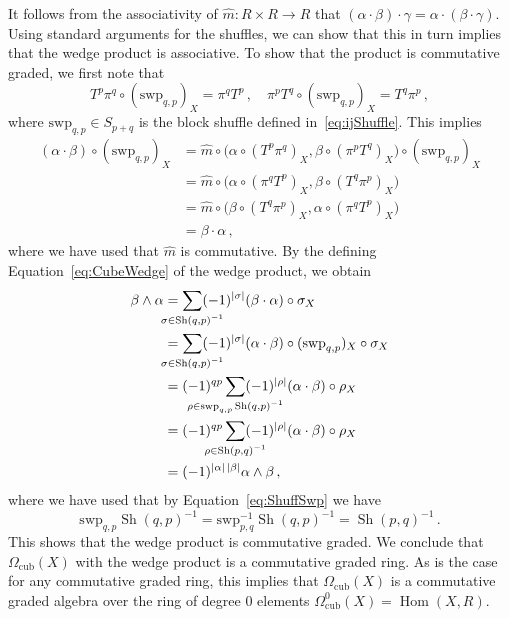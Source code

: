 \documentclass[12pt,reqno, a4paper]{amsart}
\numberwithin{equation}{section}
\theoremstyle{plain}
\theoremstyle{definition}
\theoremstyle{remark}
\DeclareMathOperator{\Hom}{Hom}
\DeclareMathOperator{\Shuff}{Sh}
\newcommand{\Rmult}{\hat{m}}
\newcommand{\Swp}{\mathrm{swp}}
\begin{document}
It follows from the associativity of $\Rmult: R \times R \to R$ that $(\alpha \cdot \beta) \cdot \gamma = \alpha \cdot (\beta \cdot \gamma)$. Using standard arguments for the shuffles, we can show that this in turn implies that the wedge product is associative. To show that the product is commutative graded, we first note that
\begin{equation*}
  T^p\pi^q \circ (\Swp_{q,p})_X = \pi^q T^p
  \,,\quad
  \pi^p T^q \circ (\Swp_{q,p})_X = T^q \pi^p
  \,,
\end{equation*}
where $\Swp_{q,p} \in S_{p+q}$ is the block shuffle defined in~\eqref{eq:ijShuffle}. This implies
\begin{equation*}
\begin{split}
  (\alpha \cdot \beta) \circ (\Swp_{q,p})_X
  &= \Rmult\circ\bigl(
       \alpha\circ (T^p\pi^q)_X,\beta\circ(\pi^pT^q)_X
     \bigr) \circ (\Swp_{q,p})_X
  \\
  &= \Rmult\circ\bigl(
       \alpha\circ (\pi^q T^p)_X,\beta\circ(T^q \pi^p)_X
     \bigr)
  \\
  &= \Rmult\circ\bigl(
       \beta\circ(T^q \pi^p)_X, \alpha\circ (\pi^q T^p)_X
     \bigr)
  \\
  &= \beta \cdot \alpha
  \,,
\end{split}
\end{equation*}
where we have used that $\Rmult$ is commutative. By the defining Equation~\eqref{eq:CubeWedge} of the wedge product, we obtain
\begin{equation*}
\begin{split}
  \beta \wedge \alpha
  &=
  \sum_{\mathclap{\sigma \in \Shuff(q,p)^{-1}}}
  (-1)^{|\sigma|} (\beta \cdot \alpha) \circ \sigma_X
  \\
  &=
  \sum_{\mathclap{\sigma \in \Shuff(q,p)^{-1}}}
  (-1)^{|\sigma|} (\alpha \cdot \beta) \circ (\Swp_{q,p})_X \circ \sigma_X
  \\
  &=
  (-1)^{qp}
  \sum_{\mathclap{\rho \in \Swp_{q,p} \Shuff(q,p)^{-1}}}
  (-1)^{|\rho|} (\alpha \cdot \beta) \circ \rho_X
  \\
  &=
  (-1)^{qp}
  \sum_{\mathclap{\rho \in \Shuff(p,q)^{-1}}}
  (-1)^{|\rho|} (\alpha \cdot \beta) \circ \rho_X
  \\
  &=
  (-1)^{|\alpha|\,|\beta|} \alpha \wedge \beta
  \,,
\end{split}
\end{equation*}
where we have used that by Equation~\eqref{eq:ShuffSwp} we have
\begin{equation*}
  \Swp_{q,p} \Shuff(q,p)^{-1}
  = \Swp_{p,q}^{-1} \Shuff(q,p)^{-1}
  = \Shuff(p,q)^{-1}
  \,.
\end{equation*}
This shows that the wedge product is commutative graded. We conclude that $\Omega_\mathrm{cub}(X)$ with the wedge product is a commutative graded ring. As is the case for any commutative graded ring, this implies that $\Omega_\mathrm{cub}(X)$ is a commutative graded algebra over the ring of degree 0 elements $\Omega^0_\mathrm{cub}(X) = \Hom(X,R)$.
\end{document}
